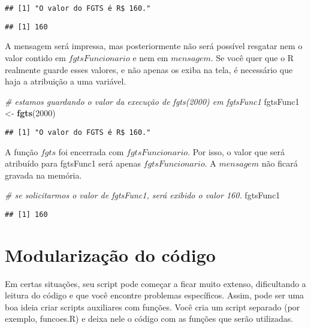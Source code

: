 \documentclass[
]{book}
\newenvironment{Shaded}{\begin{snugshade}}{\end{snugshade}}
\newcommand{\CommentTok}[1]{\textcolor[rgb]{0.56,0.35,0.01}{\textit{#1}}}
\newcommand{\DecValTok}[1]{\textcolor[rgb]{0.00,0.00,0.81}{#1}}
\newcommand{\KeywordTok}[1]{\textcolor[rgb]{0.13,0.29,0.53}{\textbf{#1}}}
\newcommand{\NormalTok}[1]{#1}
\newcommand{\StringTok}[1]{\textcolor[rgb]{0.31,0.60,0.02}{#1}}
\begin{document}
\begin{verbatim}
## [1] "O valor do FGTS é R$ 160."
\end{verbatim}

\begin{verbatim}
## [1] 160
\end{verbatim}

A mensagem será impressa, mas posteriormente não será possível resgatar nem o valor contido em \(fgtsFuncionario\) e nem em \(mensagem\). Se você quer que o R realmente guarde esses valores, e não apenas os exiba na tela, é necessário que haja a atribuição a uma variável.

\begin{Shaded}
\begin{Highlighting}[]
\CommentTok{# estamos guardando o valor da execução de fgts(2000) em fgtsFunc1}
\NormalTok{fgtsFunc1 <-}\StringTok{ }\KeywordTok{fgts}\NormalTok{(}\DecValTok{2000}\NormalTok{)}
\end{Highlighting}
\end{Shaded}

\begin{verbatim}
## [1] "O valor do FGTS é R$ 160."
\end{verbatim}

A função \(fgts\) foi encerrada com \(fgtsFuncionario\). Por isso, o valor que será atribuído para fgtsFunc1 será apenas \(fgtsFuncionario\). A \(mensagem\) não ficará gravada na memória.

\begin{Shaded}
\begin{Highlighting}[]
\CommentTok{# se solicitarmos o valor de fgtsFunc1, será exibido o valor 160.}
\NormalTok{fgtsFunc1}
\end{Highlighting}
\end{Shaded}

\begin{verbatim}
## [1] 160
\end{verbatim}

\hypertarget{modularizauxe7uxe3o-do-cuxf3digo}{%
\section{Modularização do código}\label{modularizauxe7uxe3o-do-cuxf3digo}}

Em certas situações, seu script pode começar a ficar muito extenso, dificultando a leitura do código e que você encontre problemas específicos. Assim, pode ser uma boa ideia criar scripts auxiliares com funções. Você cria um script separado (por exemplo, funcoes.R) e deixa nele o código com as funções que serão utilizadas.
\end{document}
